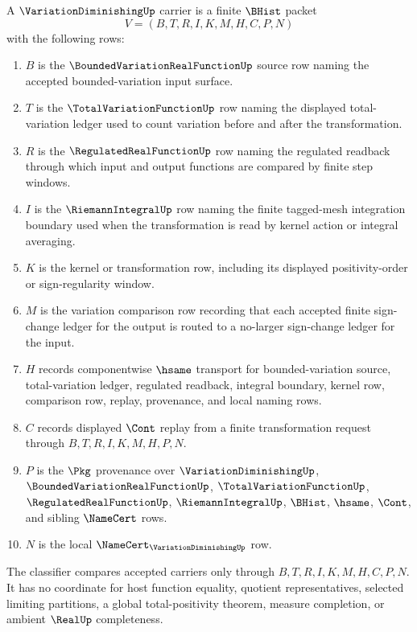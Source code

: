 \begin{definition}
\label{def:variation-diminishing-carrier}
A $\VariationDiminishingUp$ carrier is a finite $\BHist$ packet
$$
V=(B,T,R,I,K,M,H,C,P,N)
$$
with the following rows:
\begin{enumerate}
\item $B$ is the $\BoundedVariationRealFunctionUp$ source row naming the accepted bounded-variation input surface.
\item $T$ is the $\TotalVariationFunctionUp$ row naming the displayed total-variation ledger used to count variation before and after the transformation.
\item $R$ is the $\RegulatedRealFunctionUp$ row naming the regulated readback through which input and output functions are compared by finite step windows.
\item $I$ is the $\RiemannIntegralUp$ row naming the finite tagged-mesh integration boundary used when the transformation is read by kernel action or integral averaging.
\item $K$ is the kernel or transformation row, including its displayed positivity-order or sign-regularity window.
\item $M$ is the variation comparison row recording that each accepted finite sign-change ledger for the output is routed to a no-larger sign-change ledger for the input.
\item $H$ records componentwise $\hsame$ transport for bounded-variation source, total-variation ledger, regulated readback, integral boundary, kernel row, comparison row, replay, provenance, and local naming rows.
\item $C$ records displayed $\Cont$ replay from a finite transformation request through $B,T,R,I,K,M,H,P,N$.
\item $P$ is the $\Pkg$ provenance over $\VariationDiminishingUp$, $\BoundedVariationRealFunctionUp$, $\TotalVariationFunctionUp$, $\RegulatedRealFunctionUp$, $\RiemannIntegralUp$, $\BHist$, $\hsame$, $\Cont$, and sibling $\NameCert$ rows.
\item $N$ is the local $\NameCert_{\VariationDiminishingUp}$ row.
\end{enumerate}
The classifier compares accepted carriers only through $B,T,R,I,K,M,H,C,P,N$. It has no coordinate for host function equality, quotient representatives, selected limiting partitions, a global total-positivity theorem, measure completion, or ambient $\RealUp$ completeness.
\end{definition}

